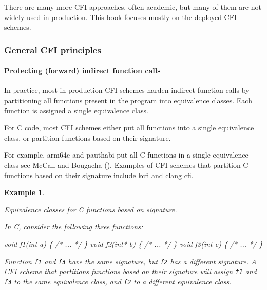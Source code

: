 \documentclass[
  a4paper,
]{report}
\newtheorem{example}{Example}
\newenvironment{Shaded}{}{}
\newcommand{\CommentTok}[1]{\textcolor[rgb]{0.38,0.63,0.69}{\textit{#1}}}
\newcommand{\DataTypeTok}[1]{\textcolor[rgb]{0.56,0.13,0.00}{#1}}
\newcommand{\NormalTok}[1]{#1}
\newcommand{\OperatorTok}[1]{\textcolor[rgb]{0.40,0.40,0.40}{#1}}
\begin{document}
There are many more CFI approaches, often academic, but many of them are
not widely used in production. This book focuses mostly on the deployed
CFI schemes.

\subsubsection{General CFI principles}\label{general-cfi-principles}

\paragraph{Protecting (forward) indirect function
calls}\label{protecting-forward-indirect-function-calls}

In practice, most in-production CFI schemes harden indirect function
calls by partitioning all functions present in the program into
\label{__index_entry_37}{equivalence
classes}. Each function is assigned a single
equivalence class.

For C code, most CFI schemes either put all functions into a single
equivalence class, or partition functions based on their
\label{__index_entry_38}{signature}.

For example,
\label{__index_entry_39}{arm64e} and
\label{__index_entry_40}{pauthabi} put
all C functions in a single equivalence class see McCall and Bougacha
(). Examples of CFI schemes that
partition C functions based on their signature include
\href{https://reviews.llvm.org/D119296}{kcfi} and
\href{https://clang.llvm.org/docs/ControlFlowIntegrityDesign.html\#forward-edge-cfi-for-indirect-function-calls}{clang
cfi}.

\begin{example}

\label{}

\textup{Equivalence classes for C functions based on signature.}

In C, consider the following three functions:

\begin{Shaded}
\begin{Highlighting}[]
\DataTypeTok{void}\NormalTok{ f1}\OperatorTok{(}\DataTypeTok{int}\NormalTok{ a}\OperatorTok{)} \OperatorTok{\{} \CommentTok{/* ... */} \OperatorTok{\}}
\DataTypeTok{void}\NormalTok{ f2}\OperatorTok{(}\DataTypeTok{int}\OperatorTok{*}\NormalTok{ b}\OperatorTok{)} \OperatorTok{\{} \CommentTok{/* ... */} \OperatorTok{\}}
\DataTypeTok{void}\NormalTok{ f3}\OperatorTok{(}\DataTypeTok{int}\NormalTok{ c}\OperatorTok{)} \OperatorTok{\{} \CommentTok{/* ... */} \OperatorTok{\}}
\end{Highlighting}
\end{Shaded}

Function \texttt{f1} and \texttt{f3} have the same signature, but
\texttt{f2} has a different signature. A CFI scheme that partitions
functions based on their signature will assign \texttt{f1} and
\texttt{f3} to the same equivalence class, and \texttt{f2} to a
different equivalence class.

\end{example}
\end{document}
